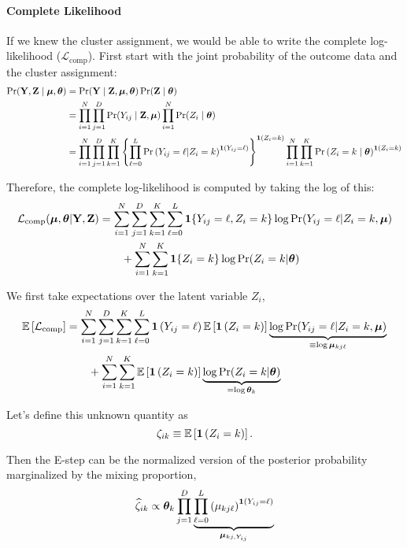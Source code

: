 \documentclass[11pt]{article}
\begin{document}
\paragraph{Complete Likelihood} If we knew the cluster assignment, we would be able to write the complete log-likelihood (\(\mathcal{L}_{\text{comp}}\)). First start with the joint probability of the outcome data and the cluster assignment:
\begin{align}
\Pr(\mathbf{Y}, \mathbf{Z} \mid \bm{\mu}, \bm{\theta}) &= \Pr(\mathbf{Y} \mid \mathbf{Z}, \bm{\mu}, \bm{\theta})\Pr(\mathbf{Z} \mid \bm{\theta})\nonumber\\
&= \prod^{N}_{i=1}\prod^{D}_{j=1}\Pr(Y_{ij} \mid \mathbf{Z}, \bm{\mu}) \prod^N_{i=1}\Pr(Z_i \mid \bm{\theta})\nonumber\\
&= \prod^{N}_{i=1}\prod^{D}_{j=1}\prod^{K}_{k=1}\left\{\prod^{L}_{\ell=0}\mathbb{\Pr}\left(Y_{ij} = \ell | Z_i = k\right)^{\bm{1}\left(Y_{ij} = \ell\right)}\right\}^{\bm{1}\left(Z_i=k\right)} \prod^N_{i=1}\prod^K_{k=1}\mathbb{\Pr}\left(Z_i = {k} \mid \bm{\theta}\right)^{\bm{1}\left(Z_i = k\right)}\nonumber
\end{align}

Therefore, the complete log-likelihood is computed by taking the log of this:
\begin{align}
\mathcal{L}_{\text{comp}}(\bm{\mu}, \bm{\theta}|\mathbf{Y}, \mathbf{Z})
& = \sum^{N}_{i=1}\sum^{D}_{j=1}\sum^{K}_{k=1}\sum^{L}_{\ell = 0}
\bm{1}\{Y_{ij} = \ell, Z_{i} = k\}
\log \Pr(Y_{ij} = \ell | Z_{i} = k, \bm{\mu})\nonumber\\
& \qquad +
\sum^N_{i=1}\sum^{K}_{k=1}\bm{1}\{Z_{i} = k\}\log \Pr(Z_{i} = k | \bm{\theta})
\end{align}

We first take expectations over the latent variable $Z_{i}$,
\begin{align}
\mathbb{E}\left[\mathcal{L}_{\text{comp}}\right]
& = \sum^{N}_{i=1}\sum^{D}_{j=1}\sum^{K}_{k=1}\sum^{L}_{\ell = 0}
\bm{1}\left(Y_{ij} = \ell\right) \mathbb{E}\left[\bm{1}\left(Z_{i} = k\right)\right]
\underbrace{\log \Pr(Y_{ij} = \ell | Z_{i} = k, \bm{\mu})}_{\equiv \log\bm{\mu}_{kj\ell}}
\nonumber\\
& \qquad +
\sum^{N}_{i=1}\sum^{K}_{k=1}\mathbb{E}\left[\bm{1}\left(Z_{i} = k\right)\right]\underbrace{\log \Pr(Z_{i} = k | \bm{\theta})}_{= \log \bm{\theta}_{k}} \label{eq:Elik}
\end{align}

 Let's define this unknown quantity as 
\[\zeta_{ik} \equiv \mathbb{E}\left[\bm{1}\left(Z_i = k\right)\right].\]

Then the E-step can be the normalized version of the posterior probability marginalized by the mixing proportion,
\begin{align}
\widehat{\zeta}_{ik} \propto \bm{\theta}_k\prod^D_{j = 1}\underbrace{\prod^{L}_{\ell = 0}\left(\mu_{kj\ell}\right)^{\bm{1}\left(Y_{ij} = \ell\right)}}_{\bm{\mu}_{kj, Y_{ij}}}
\end{align}
\end{document}
